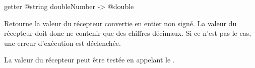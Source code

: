 
\begin{galgasbox}
getter @string doubleNumber -> @double
\end{galgasbox}

Retourne la valeur du récepteur convertie en entier non signé. La valeur du récepteur doit donc ne contenir que des chiffres décimaux. Si ce n'est pas le cas, une erreur d'exécution est déclenchée.

La valeur du récepteur peut être testée en appelant le .

%





